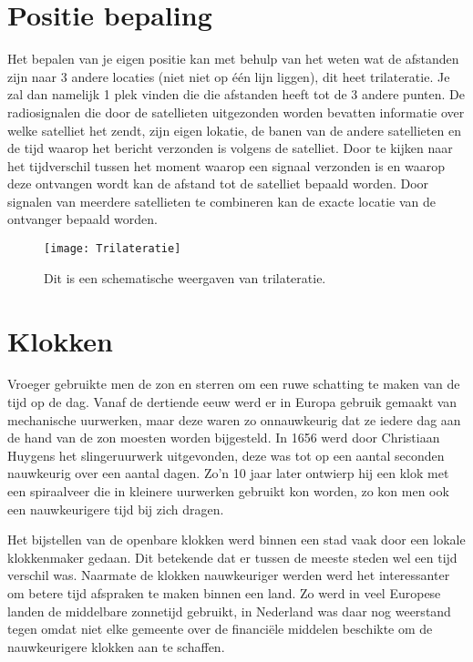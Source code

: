 \section{Positie bepaling}

Het bepalen van je eigen positie kan met behulp van het weten wat de
afstanden zijn naar 3 andere locaties (niet niet op één lijn liggen),
dit heet trilateratie. Je zal dan namelijk 1 plek vinden die die
afstanden heeft tot de 3 andere punten. De radiosignalen die door de
satellieten uitgezonden worden bevatten informatie over welke satelliet
het zendt, zijn eigen lokatie, de banen van de andere satellieten en de tijd
waarop het bericht verzonden is volgens de satelliet. Door te kijken
naar het tijdverschil tussen het moment waarop een signaal verzonden is
en waarop deze ontvangen wordt kan de afstand tot de satelliet bepaald
worden. Door signalen van meerdere satellieten te combineren kan de
exacte locatie van de ontvanger bepaald worden.

\begin{figure}
    \centering
    \texttt{[image: Trilateratie]}
    \caption{Dit is een schematische weergaven van trilateratie.}
    \label{fig:Trilateratie}
\end{figure}


\section{Klokken}

Vroeger gebruikte men de zon en sterren om een ruwe schatting te maken
van de tijd op de dag. Vanaf de dertiende eeuw werd er in Europa gebruik
gemaakt van mechanische uurwerken, maar deze waren zo onnauwkeurig dat
ze iedere dag aan de hand van de zon moesten worden bijgesteld. In 1656
werd door Christiaan Huygens het slingeruurwerk uitgevonden, deze was
tot op een aantal seconden nauwkeurig over een aantal dagen. Zo'n 10
jaar later ontwierp hij een klok met een spiraalveer die in kleinere
uurwerken gebruikt kon worden, zo kon men ook een nauwkeurigere tijd bij
zich dragen.

Het bijstellen van de openbare klokken werd binnen een stad vaak door
een lokale klokkenmaker gedaan. Dit betekende dat er tussen de meeste
steden wel een tijd verschil was. Naarmate de klokken nauwkeuriger
werden werd het interessanter om betere tijd afspraken te maken binnen
een land. Zo werd in veel Europese landen de middelbare zonnetijd
gebruikt, in Nederland was daar nog weerstand tegen omdat niet elke
gemeente over de financiële middelen beschikte om de nauwkeurigere
klokken aan te schaffen.

